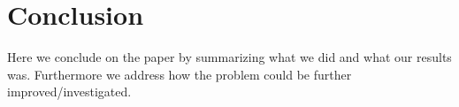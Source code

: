 \section{Conclusion}
Here we conclude on the paper by summarizing what we did and what our results was. Furthermore we address how the problem could be further improved/investigated.